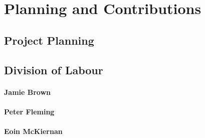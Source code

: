\documentclass[main.tex]{subfiles}
\begin{document}
\chapter{Planning and Contributions}
\section{Project Planning}
\section{Division of Labour}
\subsubsection{Jamie Brown}
\subsubsection{Peter Fleming}
\subsubsection{Eoin McKiernan}
\end{document}
